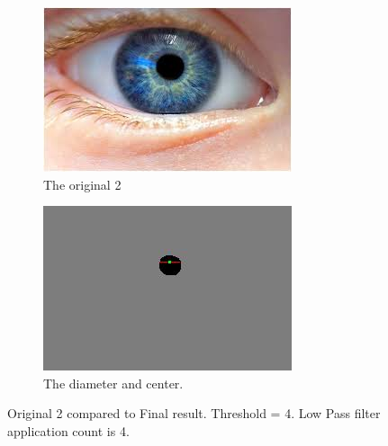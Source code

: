 \documentclass{article}
\begin{document}
%
%
\begin{figure}[H]
\centering

\begin{subfigure}{.5\textwidth}
  \centering
  \includegraphics[width=0.9\linewidth]{res/pupil/results/eye3.jpg}
  \caption{The original 2}
  \label{fig:original_img}
\end{subfigure}%
\begin{subfigure}{.5\textwidth}
  \centering
  \includegraphics[width=0.9\linewidth]{res/pupil/results/eye3_pupil.jpg}
  \caption{The diameter and center.}
  \label{fig:gray_img}
\end{subfigure}


\caption{Original 2 compared to Final result. Threshold = 4. Low Pass filter application count is 4.}
\label{fig:result_pup_org2_final}
\end{figure}
\end{document}
